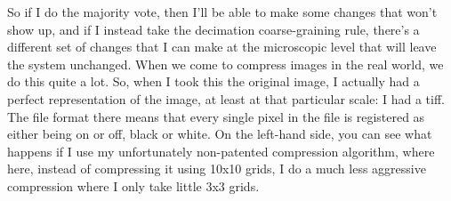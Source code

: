 \documentclass[]{article}
\begin{document}
So if I do the majority vote,
then I'll be able to make some changes
that won't show up,
and if I instead take
the decimation coarse-graining rule,
there's a different set of changes
that I can make at the microscopic level
that will leave the system unchanged.
When we come to compress images
in the real world,
we do this quite a lot.
So, when I took this the original image,
I actually had a perfect
representation of the image,
at least at that particular scale:
I had a tiff.
The file format there means
that every single pixel in the file
is registered as either being
on or off, black or white.
On the left-hand side,
you can see what happens
if I use my unfortunately non-patented
compression algorithm,
where here, instead of compressing it
using 10x10 grids,
I do a much less aggressive compression
where I only take little 3x3 grids.
\end{document}

